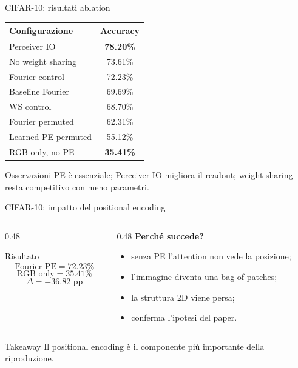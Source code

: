 \documentclass[aspectratio=169,10pt]{beamer}
\newcommand{\good}[1]{\textcolor{AccentGreen}{\textbf{#1}}}
\newcommand{\bad}[1]{\textcolor{AccentRed}{\textbf{#1}}}
\begin{document}
\begin{frame}{CIFAR-10: risultati ablation}
\small
\begin{center}
\begin{tabular}{lc}
\toprule
\textbf{Configurazione} & \textbf{Accuracy} \\
\midrule
Perceiver IO & \good{78.20\%} \\
No weight sharing & 73.61\% \\
Fourier control & 72.23\% \\
Baseline Fourier & 69.69\% \\
WS control & 68.70\% \\
Fourier permuted & 62.31\% \\
Learned PE permuted & 55.12\% \\
RGB only, no PE & \bad{35.41\%} \\
\bottomrule
\end{tabular}
\end{center}

\begin{exampleblock}{Osservazioni}
PE è essenziale; Perceiver IO migliora il readout; weight sharing resta competitivo con meno parametri.
\end{exampleblock}
\end{frame}

\begin{frame}{CIFAR-10: impatto del positional encoding}
\small
\begin{columns}[T]
\begin{column}{0.48\textwidth}
\begin{block}{Risultato}
\[
\text{Fourier PE}=72.23\%
\]
\[
\text{RGB only}=35.41\%
\]
\[
\Delta=-36.82\text{ pp}
\]
\end{block}
\end{column}
\begin{column}{0.48\textwidth}
\textbf{Perché succede?}
\begin{itemize}
  \item senza PE l'attention non vede la posizione;
  \item l'immagine diventa una bag of patches;
  \item la struttura 2D viene persa;
  \item conferma l'ipotesi del paper.
\end{itemize}
\end{column}
\end{columns}

\begin{alertblock}{Takeaway}
Il positional encoding è il componente più importante della riproduzione.
\end{alertblock}
\end{frame}
\end{document}

